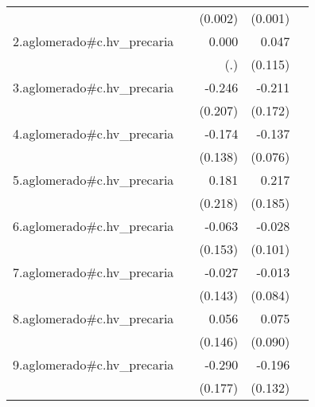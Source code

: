 {\begin{longtable}{l*{4}{D{.}{.}{-1}}}
            &                     &     (0.002)         &     (0.001)         &                     \\
\addlinespace
2.aglomerado#c.hv\_precaria&                     &       0.000         &       0.047         &                     \\
            &                     &         (.)         &     (0.115)         &                     \\
\addlinespace
3.aglomerado#c.hv\_precaria&                     &      -0.246         &      -0.211         &                     \\
            &                     &     (0.207)         &     (0.172)         &                     \\
\addlinespace
4.aglomerado#c.hv\_precaria&                     &      -0.174         &      -0.137         &                     \\
            &                     &     (0.138)         &     (0.076)         &                     \\
\addlinespace
5.aglomerado#c.hv\_precaria&                     &       0.181         &       0.217         &                     \\
            &                     &     (0.218)         &     (0.185)         &                     \\
\addlinespace
6.aglomerado#c.hv\_precaria&                     &      -0.063         &      -0.028         &                     \\
            &                     &     (0.153)         &     (0.101)         &                     \\
\addlinespace
7.aglomerado#c.hv\_precaria&                     &      -0.027         &      -0.013         &                     \\
            &                     &     (0.143)         &     (0.084)         &                     \\
\addlinespace
8.aglomerado#c.hv\_precaria&                     &       0.056         &       0.075         &                     \\
            &                     &     (0.146)         &     (0.090)         &                     \\
\addlinespace
9.aglomerado#c.hv\_precaria&                     &      -0.290         &      -0.196         &                     \\
            &                     &     (0.177)         &     (0.132)         &                     \\

\end{longtable}}
